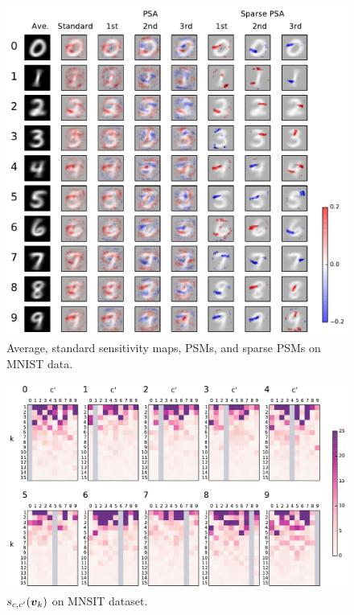 %
\newpage
\begin{figure}[htbp]
 \centering
 \includegraphics[width=0.9\columnwidth]{./fig/appendix4.pdf}
 \caption{
 Average, standard sensitivity maps, PSMs, and sparse PSMs on MNIST data.
 }
 \label{app:4}
\end{figure}
%
\begin{figure}[htb]
 \centering
 \includegraphics[width=0.9\columnwidth]{./fig/appendix5.pdf}
 \caption{
 $s_{c, c'}(\mbox{\boldmath $v$}_{k})$ on MNSIT dataset.
 }
 \label{app:5}
\end{figure}

\clearpage

